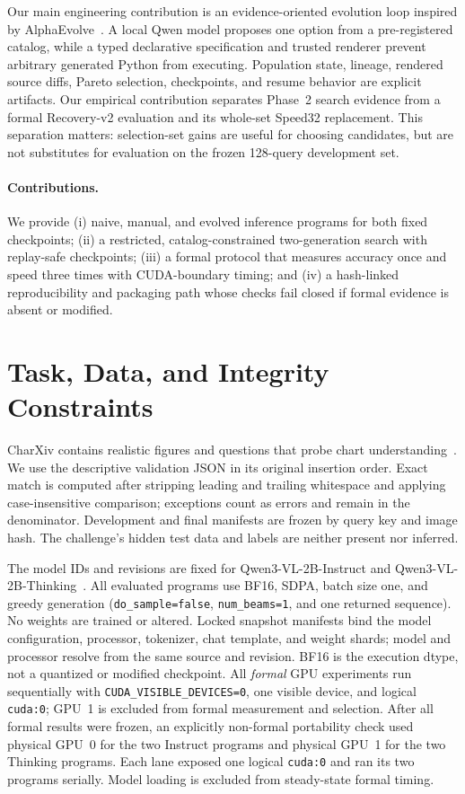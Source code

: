 \documentclass{article}
\begin{document}
Our main engineering contribution is an evidence-oriented evolution loop inspired
by AlphaEvolve~\citep{alphaevolve2025}. A local Qwen model proposes one option
from a pre-registered catalog, while a typed declarative specification and trusted
renderer prevent arbitrary generated Python from executing. Population state,
lineage, rendered source diffs, Pareto selection, checkpoints, and resume behavior
are explicit artifacts. Our empirical contribution separates Phase~2 search
evidence from a formal Recovery-v2 evaluation and its whole-set Speed32
replacement. This separation matters:
selection-set gains are useful for choosing candidates, but are not substitutes
for evaluation on the frozen 128-query development set.

\paragraph{Contributions.}
We provide (i) naive, manual, and evolved inference programs for both fixed
checkpoints; (ii) a restricted, catalog-constrained two-generation search with
replay-safe checkpoints; (iii) a formal protocol that measures accuracy once and
speed three times with CUDA-boundary timing; and (iv) a hash-linked reproducibility
and packaging path whose checks fail closed if formal evidence is absent or
modified.

\section{Task, Data, and Integrity Constraints}
CharXiv contains realistic figures and questions that probe chart
understanding~\citep{wang2024charxiv}. We use the descriptive validation JSON in
its original insertion order. Exact match is computed after stripping leading
and trailing whitespace and applying case-insensitive comparison; exceptions count
as errors and remain in the denominator. Development and final manifests are
frozen by query key and image hash. The challenge's hidden test data and labels
are neither present nor inferred.

The model IDs and revisions are fixed for Qwen3-VL-2B-Instruct and
Qwen3-VL-2B-Thinking~\citep{bai2025qwen3vl}. All evaluated programs use BF16,
SDPA, batch size one, and greedy generation
(\texttt{do\_sample=false}, \texttt{num\_beams=1}, and one returned sequence).
No weights are trained or altered. Locked snapshot manifests bind the model
configuration, processor, tokenizer, chat template, and weight shards; model and
processor resolve from the same source and revision. BF16 is the execution dtype,
not a quantized or modified checkpoint. All \emph{formal} GPU experiments run
sequentially with \texttt{CUDA\_VISIBLE\_DEVICES=0}, one visible device, and
logical \texttt{cuda:0}; GPU~1 is excluded from formal measurement and selection.
After all formal results were frozen, an explicitly non-formal portability check
used physical GPU~0 for the two Instruct programs and physical GPU~1 for the two
Thinking programs. Each lane exposed one logical \texttt{cuda:0} and ran its two
programs serially. Model loading is excluded from steady-state formal timing.
\end{document}
